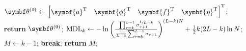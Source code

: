 \begin{algorithm}
\begin{algorithmic}[1]
            \State $\bthzero \gets
                \begin{bmatrix}
                    \symbf{a}\T &
                    \symbf{\phi}\T &
                    \symbf{f}\T &
                    \symbf{\eta}\T
                \end{bmatrix}\T
            $;
            \State \textbf{return} $\bthzero$;
        \EndProcedure
        \Statex
        \label{state:mdl}
                \State $\operatorname{MDL}_k \gets
                -\ln\left(
                    \frac
                    {\prod_{r=k}^{L-1} \sigma_{r+1}^{\nicefrac{1}{L-k}}}
                    {\frac{1}{L-k} \sum_{r=k}^{L-1} \sigma_{r+1}}
                \right)^{(L-k)N}
                + \frac{1}{2}k(2L - k)\ln N
                $;
                    \State $M \gets k-1$;
                    \State \textbf{break};
                \EndIf
            \EndFor
            \State \textbf{return} $M$;
        \EndProcedure
    \end{algorithmic}
\end{algorithm}



